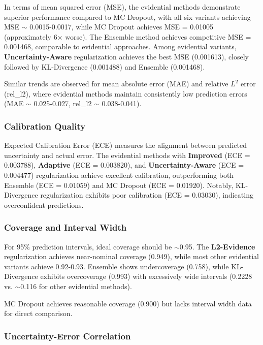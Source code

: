 In terms of mean squared error (MSE), the evidential methods demonstrate superior performance compared to MC Dropout, with all six variants achieving MSE $\sim$ 0.0015-0.0017, while MC Dropout achieves MSE = 0.01005 (approximately 6$\times$ worse). The Ensemble method achieves competitive MSE = 0.001468, comparable to evidential approaches. Among evidential variants, \textbf{Uncertainty-Aware} regularization achieves the best MSE (0.001613), closely followed by KL-Divergence (0.001488) and Ensemble (0.001468).

Similar trends are observed for mean absolute error (MAE) and relative $L^2$ error (rel\_l2), where evidential methods maintain consistently low prediction errors (MAE $\sim$ 0.025-0.027, rel\_l2 $\sim$ 0.038-0.041).

\subsubsection{Calibration Quality}

Expected Calibration Error (ECE) measures the alignment between predicted uncertainty and actual error. The evidential methods with \textbf{Improved} (ECE = 0.003788), \textbf{Adaptive} (ECE = 0.003820), and \textbf{Uncertainty-Aware} (ECE = 0.004477) regularization achieve excellent calibration, outperforming both Ensemble (ECE = 0.01059) and MC Dropout (ECE = 0.01920). Notably, KL-Divergence regularization exhibits poor calibration (ECE = 0.03030), indicating overconfident predictions.

\subsubsection{Coverage and Interval Width}

For 95\% prediction intervals, ideal coverage should be $\sim$0.95. The \textbf{L2-Evidence} regularization achieves near-nominal coverage (0.949), while most other evidential variants achieve 0.92-0.93. Ensemble shows undercoverage (0.758), while KL-Divergence exhibits overcoverage (0.993) with excessively wide intervals (0.2228 vs. $\sim$0.116 for other evidential methods).

MC Dropout achieves reasonable coverage (0.900) but lacks interval width data for direct comparison.

\subsubsection{Uncertainty-Error Correlation}

